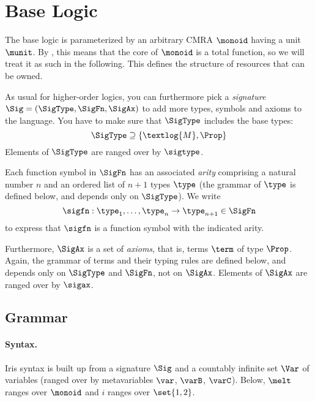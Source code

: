 \section{Base Logic}
\label{sec:base-logic}

The base logic is parameterized by an arbitrary CMRA $\monoid$ having a unit $\munit$.
By , this means that the core of $\monoid$ is a total function, so we will treat it as such in the following.
This defines the structure of resources that can be owned.

As usual for higher-order logics, you can furthermore pick a \emph{signature} $\Sig = (\SigType, \SigFn, \SigAx)$ to add more types, symbols and axioms to the language.
You have to make sure that $\SigType$ includes the base types:
\[
	\SigType \supseteq \{ \textlog{M}, \Prop \}
\]
Elements of $\SigType$ are ranged over by $\sigtype$.

Each function symbol in $\SigFn$ has an associated \emph{arity} comprising a natural number $n$ and an ordered list of $n+1$ types $\type$ (the grammar of $\type$ is defined below, and depends only on $\SigType$).
We write
\[
	\sigfn : \type_1, \dots, \type_n \to \type_{n+1} \in \SigFn
\]
to express that $\sigfn$ is a function symbol with the indicated arity.

Furthermore, $\SigAx$ is a set of \emph{axioms}, that is, terms $\term$ of type $\Prop$.
Again, the grammar of terms and their typing rules are defined below, and depends only on $\SigType$ and $\SigFn$, not on $\SigAx$.
Elements of $\SigAx$ are ranged over by $\sigax$.

\subsection{Grammar}\label{sec:grammar}

\paragraph{Syntax.}
Iris syntax is built up from a signature $\Sig$ and a countably infinite set $\Var$ of variables (ranged over by metavariables $\var$, $\varB$, $\varC$).
Below, $\melt$ ranges over $\monoid$ and $i$ ranges over $\set{1,2}$.

